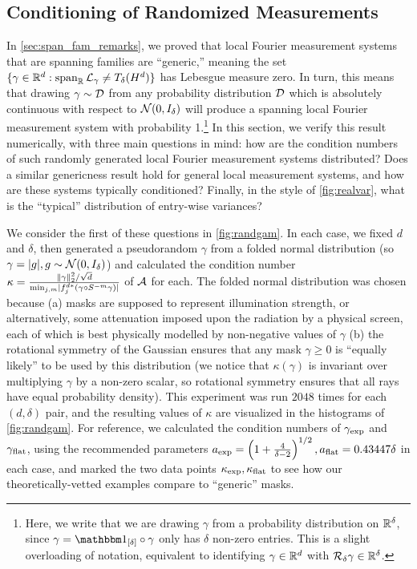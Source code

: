 \subsection{Conditioning of Randomized Measurements}
\label{sec:rand_fam}
In \cref{sec:span_fam_remarks}, we proved that local Fourier measurement systems that are spanning families are ``generic,'' meaning the set $\{\gamma \in \mathbb{R}^d : \operatorname{span}_{\mathbb{R}} \mathcal{L}_\gamma \neq T_\delta(H^d)\}$ has Lebesgue measure zero.  In turn, this means that drawing $\gamma \sim \mathcal{D}$ from any probability distribution $\mathcal{D}$ which is absolutely continuous with respect to $\mathcal{N}(0, I_\delta)$ will produce a spanning local Fourier measurement system with probability 1.\footnote{Here, we write that we are drawing $\gamma$ from a probability distribution on $\mathbb{R}^\delta$, since $\gamma = \one_{[\delta]} \circ \gamma$ only has $\delta$ non-zero entries.  This is a slight overloading of notation, equivalent to identifying $\gamma \in \mathbb{R}^d$ with $\mathcal{R}_\delta \gamma \in \mathbb{R}^\delta$.}  In this section, we verify this result numerically, with three main questions in mind: how are the condition numbers of such randomly generated local Fourier measurement systems distributed?  Does a similar genericness result hold for general local measurement systems, and how are these systems typically conditioned?  Finally, in the style of \cref{fig:realvar}, what is the ``typical'' distribution of entry-wise variances?

We consider the first of these questions in \cref{fig:randgam}.  In each case, we fixed $d$ and $\delta$, then generated a pseudorandom $\gamma$ from a folded normal distribution (so $\gamma = \lvert g\rvert, g \sim \mathcal{N}(0, I_\delta)$) and calculated the condition number $\kappa = \frac{\lVert\gamma\rVert_2^2 / \sqrt{d}}{\min_{j, m} \lvert f_j^{d*}(\gamma \circ S^{-m} \gamma)\rvert}$ of $\mathcal{A}$ for each.  The folded normal distribution was chosen because (a) masks are supposed to represent illumination strength, or alternatively, some attenuation imposed upon the radiation by a physical screen, each of which is best physically modelled by non-negative values of $\gamma$ (b) the rotational symmetry of the Gaussian ensures that any mask $\gamma \ge 0$ is ``equally likely'' to be used by this distribution (we notice that $\kappa(\gamma)$ is invariant over multiplying $\gamma$ by a non-zero scalar, so rotational symmetry ensures that all rays have equal probability density).  This experiment was run $2048$ times for each $(d, \delta)$ pair, and the resulting values of $\kappa$ are visualized in the histograms of \cref{fig:randgam}.  For reference, we calculated the condition numbers of $\gamma_{\rm exp}$ and $\gamma_{\rm flat}$, using the recommended parameters $a_{\rm exp} = \left(1 + \frac{4}{\delta - 2}\right)^{1 / 2}, a_{\rm flat} = 0.43447 \delta$ in each case, and marked the two data points $\kappa_{\rm exp}, \kappa_{\rm flat}$ to see how our theoretically-vetted examples compare to ``generic'' masks.

